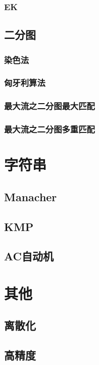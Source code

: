 \documentclass[12pt,a4paper]{article}
\begin{document}
\subsubsection{EK}

\subsection{二分图}
\subsubsection{染色法}

\subsubsection{匈牙利算法}

\subsubsection{最大流之二分图最大匹配}

\subsubsection{最大流之二分图多重匹配}

\section{字符串}
\subsection{Manacher}

\subsection{KMP}

\subsection{AC自动机}

\section{其他}
\subsection{离散化}

\subsection{高精度}

\end{document}
